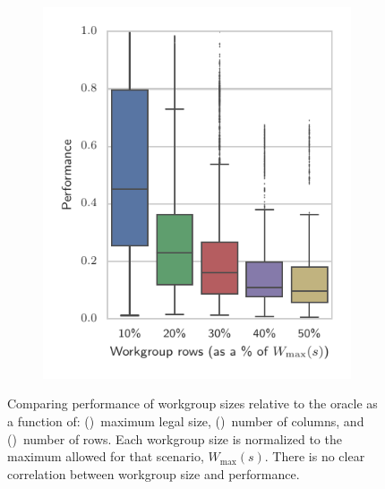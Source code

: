 \begin{figure}
{\begin{minipage}{.48\textwidth}
\begin{subfigure}[h]{.48\columnwidth}
      \vspace{-1.5em} %
      \caption{}
      \label{fig:performance-wg-c}
    \end{subfigure}
    ~%
    \begin{subfigure}[h]{.48\columnwidth}
      \centering
      \includegraphics[width=\columnwidth]{img/performance_max_r}
      \vspace{-1.5em} %
      \caption{}
      \label{fig:performance-wg-r}
    \end{subfigure}
    \caption{%
      Comparing performance of workgroup sizes relative to the oracle as
      a function of: ()~maximum legal
      size, ()~number of columns, and
      ()~number of rows. Each workgroup
      size is normalized to the maximum allowed for that scenario,
      $W_{\max}(s)$. There is no clear correlation between workgroup
      size and performance.%
    }
    \label{fig:performance-wgsizes}
  \end{minipage}%
}%
\hspace{2.5mm}

\end{figure}
